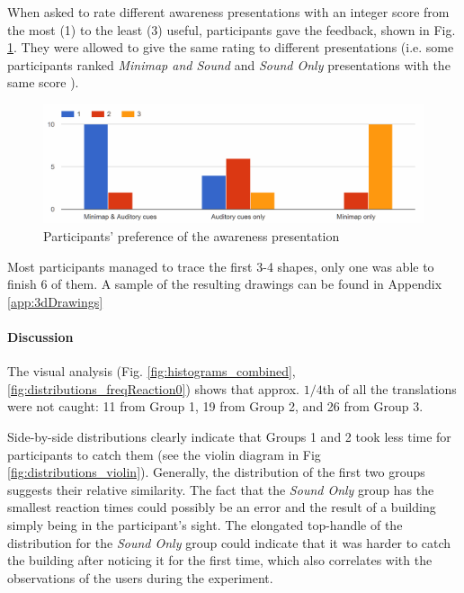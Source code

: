 When asked to rate different awareness presentations with an integer score from the most (1) to the least (3) useful, participants gave the feedback, shown in Fig. \ref{fig:finalstudyawarenesspresentationuserpreference}. They were allowed to give the same rating to different presentations (i.e. some participants ranked \textit{Minimap and Sound} and \textit{Sound Only} presentations with the same score ).

\begin{figure}
	\centering
	\includegraphics[width=0.7\linewidth]{figures/final_study_awareness_presentation_user_preference}
	\caption{Participants' preference of the awareness presentation}
	\label{fig:finalstudyawarenesspresentationuserpreference}
\end{figure}

Most participants managed to trace the first 3-4 shapes, only one was able to finish 6 of them. A sample of the resulting drawings can be found in Appendix \ref{app:3dDrawings}

\paragraph{Discussion}
The visual analysis (Fig. \ref{fig:histograms_combined}, \ref{fig:distributions_freqReaction0}) shows that approx. $1/4$th of all the translations were not caught: 11 from Group 1, 19 from Group 2, and 26 from Group 3. %

Side-by-side distributions clearly indicate that Groups 1 and 2 took less time for participants to catch them (see the violin diagram in Fig \ref{fig:distributions_violin}). Generally, the distribution of the first two groups suggests their relative similarity. The fact that the \textit{Sound Only} group has the smallest reaction times could possibly be an error and the result of a building simply being in the participant's sight. The elongated top-handle of the distribution for the \textit{Sound Only} group could indicate that it was harder to catch the building after noticing it for the first time, which also correlates with the observations of the users during the experiment.


